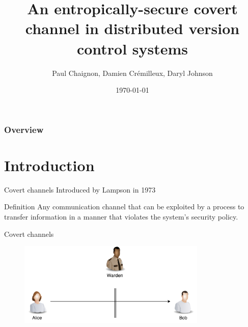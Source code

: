 \documentclass[11pt, compress]{beamer}
\title{An entropically-secure covert channel in distributed version control systems}
\subtitle{}
\date{\today}
\author{Paul Chaignon, Damien Cr\'emilleux, Daryl Johnson}
\institute{Rochester Institute of Technology}
\begin{document}
\begin{frame}
\titlepage 
\end{frame}


\begin{frame}
\frametitle{Overview} %
\tableofcontents %
\end{frame}


\section{Introduction}

\begin{frame}{Covert channels}
\vfill
Introduced by Lampson in 1973
\vfill
\begin{block}{Definition}
Any communication channel that can be exploited by a process to transfer information in a manner that violates the system's security policy.
\end{block}
\vfill
\end{frame}

\begin{frame}{Covert channels}
\begin{figure}
  \centering
    \includegraphics[width=0.8\textwidth]{images/covert_channel_1.png}
  \label{fig:covert_channel_1}
\end{figure}
\end{frame}
\end{document}
